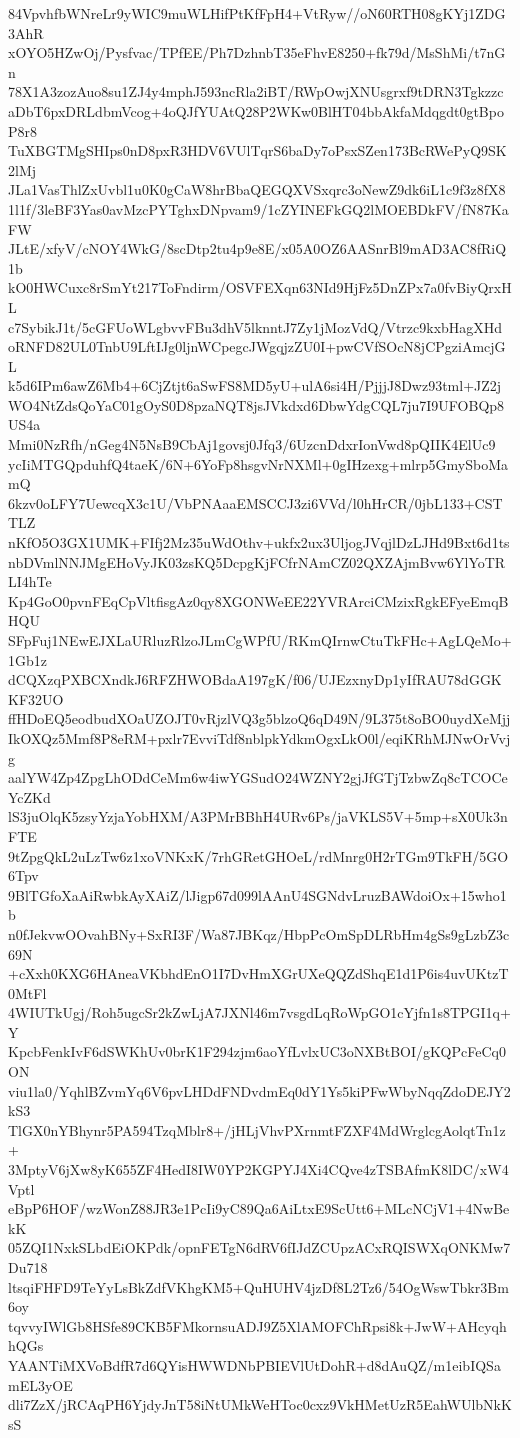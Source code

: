 84VpvhfbWNreLr9yWIC9muWLHifPtKfFpH4+VtRyw//oN60RTH08gKYj1ZDG3AhR
xOYO5HZwOj/Pysfvac/TPfEE/Ph7DzhnbT35eFhvE8250+fk79d/MsShMi/t7nGn
78X1A3zozAuo8su1ZJ4y4mphJ593ncRla2iBT/RWpOwjXNUsgrxf9tDRN3Tgkzzc
aDbT6pxDRLdbmVcog+4oQJfYUAtQ28P2WKw0BlHT04bbAkfaMdqgdt0gtBpoP8r8
TuXBGTMgSHIps0nD8pxR3HDV6VUlTqrS6baDy7oPsxSZen173BcRWePyQ9SK2lMj
JLa1VasThlZxUvbl1u0K0gCaW8hrBbaQEGQXVSxqrc3oNewZ9dk6iL1c9f3z8fX8
1l1f/3leBF3Yas0avMzcPYTghxDNpvam9/1cZYINEFkGQ2lMOEBDkFV/fN87KaFW
JLtE/xfyV/cNOY4WkG/8scDtp2tu4p9e8E/x05A0OZ6AASnrBl9mAD3AC8fRiQ1b
kO0HWCuxc8rSmYt217ToFndirm/OSVFEXqn63NId9HjFz5DnZPx7a0fvBiyQrxHL
c7SybikJ1t/5cGFUoWLgbvvFBu3dhV5lknntJ7Zy1jMozVdQ/Vtrzc9kxbHagXHd
oRNFD82UL0TnbU9LftIJg0ljnWCpegcJWgqjzZU0I+pwCVfSOcN8jCPgziAmcjGL
k5d6IPm6awZ6Mb4+6CjZtjt6aSwFS8MD5yU+ulA6si4H/PjjjJ8Dwz93tml+JZ2j
WO4NtZdsQoYaC01gOyS0D8pzaNQT8jsJVkdxd6DbwYdgCQL7ju7I9UFOBQp8US4a
Mmi0NzRfh/nGeg4N5NsB9CbAj1govsj0Jfq3/6UzcnDdxrIonVwd8pQIIK4ElUc9
ycIiMTGQpduhfQ4taeK/6N+6YoFp8hsgvNrNXMl+0gIHzexg+mlrp5GmySboMamQ
6kzv0oLFY7UewcqX3c1U/VbPNAaaEMSCCJ3zi6VVd/l0hHrCR/0jbL133+CSTTLZ
nKfO5O3GX1UMK+FIfj2Mz35uWdOthv+ukfx2ux3UljogJVqjlDzLJHd9Bxt6d1ts
nbDVmlNNJMgEHoVyJK03zsKQ5DcpgKjFCfrNAmCZ02QXZAjmBvw6YlYoTRLI4hTe
Kp4GoO0pvnFEqCpVltfisgAz0qy8XGONWeEE22YVRArciCMzixRgkEFyeEmqBHQU
SFpFuj1NEwEJXLaURluzRlzoJLmCgWPfU/RKmQIrnwCtuTkFHc+AgLQeMo+1Gb1z
dCQXzqPXBCXndkJ6RFZHWOBdaA197gK/f06/UJEzxnyDp1yIfRAU78dGGKKF32UO
ffHDoEQ5eodbudXOaUZOJT0vRjzlVQ3g5blzoQ6qD49N/9L375t8oBO0uydXeMjj
IkOXQz5Mmf8P8eRM+pxlr7EvviTdf8nblpkYdkmOgxLkO0l/eqiKRhMJNwOrVvjg
aalYW4Zp4ZpgLhODdCeMm6w4iwYGSudO24WZNY2gjJfGTjTzbwZq8cTCOCeYcZKd
lS3juOlqK5zsyYzjaYobHXM/A3PMrBBhH4URv6Ps/jaVKLS5V+5mp+sX0Uk3nFTE
9tZpgQkL2uLzTw6z1xoVNKxK/7rhGRetGHOeL/rdMnrg0H2rTGm9TkFH/5GO6Tpv
9BlTGfoXaAiRwbkAyXAiZ/lJigp67d099lAAnU4SGNdvLruzBAWdoiOx+15who1b
n0fJekvwOOvahBNy+SxRI3F/Wa87JBKqz/HbpPcOmSpDLRbHm4gSs9gLzbZ3c69N
+cXxh0KXG6HAneaVKbhdEnO1I7DvHmXGrUXeQQZdShqE1d1P6is4uvUKtzT0MtFl
4WIUTkUgj/Roh5ugcSr2kZwLjA7JXNl46m7vsgdLqRoWpGO1cYjfn1s8TPGI1q+Y
KpcbFenkIvF6dSWKhUv0brK1F294zjm6aoYfLvlxUC3oNXBtBOI/gKQPcFeCq0ON
viu1la0/YqhlBZvmYq6V6pvLHDdFNDvdmEq0dY1Ys5kiPFwWbyNqqZdoDEJY2kS3
TlGX0nYBhynr5PA594TzqMblr8+/jHLjVhvPXrnmtFZXF4MdWrglcgAolqtTn1z+
3MptyV6jXw8yK655ZF4HedI8IW0YP2KGPYJ4Xi4CQve4zTSBAfmK8lDC/xW4Vptl
eBpP6HOF/wzWonZ88JR3e1PcIi9yC89Qa6AiLtxE9ScUtt6+MLcNCjV1+4NwBekK
05ZQI1NxkSLbdEiOKPdk/opnFETgN6dRV6fIJdZCUpzACxRQISWXqONKMw7Du718
ltsqiFHFD9TeYyLsBkZdfVKhgKM5+QuHUHV4jzDf8L2Tz6/54OgWswTbkr3Bm6oy
tqvvyIWlGb8HSfe89CKB5FMkornsuADJ9Z5XlAMOFChRpsi8k+JwW+AHcyqhhQGs
YAANTiMXVoBdfR7d6QYisHWWDNbPBIEVlUtDohR+d8dAuQZ/m1eibIQSamEL3yOE
dli7ZzX/jRCAqPH6YjdyJnT58iNtUMkWeHToc0cxz9VkHMetUzR5EahWUlbNkKsS
